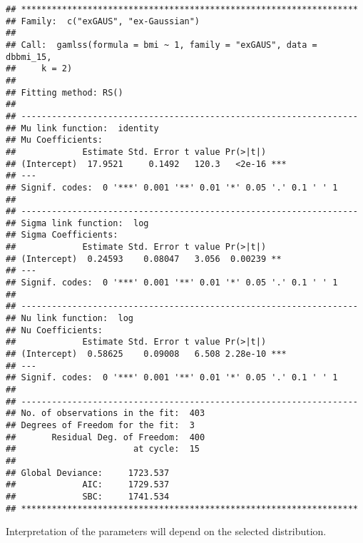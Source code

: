 \documentclass[
]{article}
\begin{document}
\begin{verbatim}
## ******************************************************************
## Family:  c("exGAUS", "ex-Gaussian") 
## 
## Call:  gamlss(formula = bmi ~ 1, family = "exGAUS", data = dbbmi_15,  
##     k = 2) 
## 
## Fitting method: RS() 
## 
## ------------------------------------------------------------------
## Mu link function:  identity
## Mu Coefficients:
##             Estimate Std. Error t value Pr(>|t|)    
## (Intercept)  17.9521     0.1492   120.3   <2e-16 ***
## ---
## Signif. codes:  0 '***' 0.001 '**' 0.01 '*' 0.05 '.' 0.1 ' ' 1
## 
## ------------------------------------------------------------------
## Sigma link function:  log
## Sigma Coefficients:
##             Estimate Std. Error t value Pr(>|t|)   
## (Intercept)  0.24593    0.08047   3.056  0.00239 **
## ---
## Signif. codes:  0 '***' 0.001 '**' 0.01 '*' 0.05 '.' 0.1 ' ' 1
## 
## ------------------------------------------------------------------
## Nu link function:  log 
## Nu Coefficients:
##             Estimate Std. Error t value Pr(>|t|)    
## (Intercept)  0.58625    0.09008   6.508 2.28e-10 ***
## ---
## Signif. codes:  0 '***' 0.001 '**' 0.01 '*' 0.05 '.' 0.1 ' ' 1
## 
## ------------------------------------------------------------------
## No. of observations in the fit:  403 
## Degrees of Freedom for the fit:  3
##       Residual Deg. of Freedom:  400 
##                       at cycle:  15 
##  
## Global Deviance:     1723.537 
##             AIC:     1729.537 
##             SBC:     1741.534 
## ******************************************************************
\end{verbatim}

Interpretation of the parameters will depend on the selected
distribution.
\end{document}
